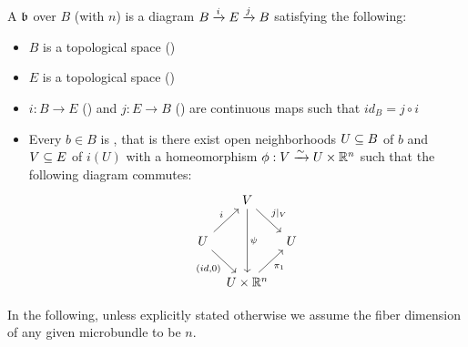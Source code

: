 \begin{mydefinition}[microbundle]
    A  $\bb$ over $B$ (with  $n$) is a diagram $\bundle{B}{E}{i}{j}$ satisfying the following:
    \begin{itemize}
        \item $B$ is a topological space ()
        \item $E$ is a topological space ()
        \item $i: B \to E$ () and $j: E \to B$ () are continuous maps such that $id_B = j \circ i$
        \item Every $b \in B$ is , that is there exist open neighborhoods $U \sub B$ of $b$ and $V \sub E$ of $i(U)$ with a homeomorphism $\phi: V \isomto U \times \R^n$ such that the following diagram commutes:
        \[
            \begin{tikzcd}[column sep=tiny]
                & V \ar[dr, "j\vert_V"] \ar[dd, "\psi"] & \\
                U \ar[ur, "i"] \ar[dr, "{(id, 0)}"'] & & U \\
                & U \times\R^n \ar[ur, "\pi_1"'] &
            \end{tikzcd}
        \]
    \end{itemize}
\end{mydefinition}

\begin{myremark}
    In the following, unless explicitly stated otherwise we assume the fiber dimension of any given microbundle to be $n$.
\end{myremark}